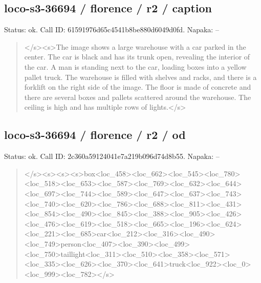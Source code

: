 \documentclass[10pt,a4paper]{article}
\begin{document}
\subsection*{loco-s3-36694 / florence / r2 / caption}
Status: ok. Call ID: 61591976d65c4541b8be880d6049d0fd. Napaka: --
\begin{quote}\footnotesize
</s>\allowbreak{}<s>\allowbreak{}The image shows a large warehouse with a car parked in the center. The car is black and has its trunk open,\allowbreak{} revealing the interior of the car. A man is standing next to the car,\allowbreak{} loading boxes into a yellow pallet truck. The warehouse is filled with shelves and racks,\allowbreak{} and there is a forklift on the right side of the image. The floor is made of concrete and there are several boxes and pallets scattered around the warehouse. The ceiling is high and has multiple rows of lights.</s>\allowbreak{}
\end{quote}
\subsection*{loco-s3-36694 / florence / r2 / od}
Status: ok. Call ID: 2c360a59124041e7a219b096d74d8b55. Napaka: --
\begin{quote}\footnotesize
</s>\allowbreak{}<s>\allowbreak{}<s>\allowbreak{}<s>\allowbreak{}box<loc\_458>\allowbreak{}<loc\_66\allowbreak{}2>\allowbreak{}<loc\_545>\allowbreak{}<loc\_780>\allowbreak{}<loc\_518>\allowbreak{}<lo\allowbreak{}c\_653>\allowbreak{}<loc\_587>\allowbreak{}<loc\_769>\allowbreak{}<loc\_632\allowbreak{}>\allowbreak{}<loc\_644>\allowbreak{}<loc\_697>\allowbreak{}<loc\_744>\allowbreak{}<loc\allowbreak{}\_589>\allowbreak{}<loc\_647>\allowbreak{}<loc\_637>\allowbreak{}<loc\_743>\allowbreak{}\allowbreak{}<loc\_740>\allowbreak{}<loc\_620>\allowbreak{}<loc\_786>\allowbreak{}<loc\_\allowbreak{}688>\allowbreak{}<loc\_811>\allowbreak{}<loc\_431>\allowbreak{}<loc\_854>\allowbreak{}<\allowbreak{}loc\_490>\allowbreak{}<loc\_845>\allowbreak{}<loc\_388>\allowbreak{}<loc\_9\allowbreak{}05>\allowbreak{}<loc\_426>\allowbreak{}<loc\_476>\allowbreak{}<loc\_619>\allowbreak{}<l\allowbreak{}oc\_518>\allowbreak{}<loc\_665>\allowbreak{}<loc\_196>\allowbreak{}<loc\_62\allowbreak{}4>\allowbreak{}<loc\_221>\allowbreak{}<loc\_685>\allowbreak{}car<loc\_212>\allowbreak{}\allowbreak{}<loc\_316>\allowbreak{}<loc\_490>\allowbreak{}<loc\_749>\allowbreak{}perso\allowbreak{}n<loc\_407>\allowbreak{}<loc\_390>\allowbreak{}<loc\_499>\allowbreak{}<loc\allowbreak{}\_750>\allowbreak{}taillight<loc\_311>\allowbreak{}<loc\_510>\allowbreak{}\allowbreak{}<loc\_358>\allowbreak{}<loc\_571>\allowbreak{}<loc\_335>\allowbreak{}<loc\_\allowbreak{}626>\allowbreak{}<loc\_370>\allowbreak{}<loc\_641>\allowbreak{}truck<loc\_\allowbreak{}922>\allowbreak{}<loc\_0>\allowbreak{}<loc\_999>\allowbreak{}<loc\_782>\allowbreak{}</s\allowbreak{}>\allowbreak{}
\end{quote}
\end{document}
